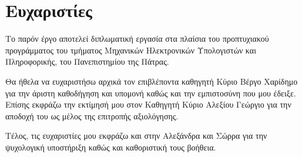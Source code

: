 \section*{Ευχαριστίες}
\thispagestyle{empty}
\begin{spacing}{1.5}
Το παρόν έργο αποτελεί διπλωματική εργασία στα πλαίσια του προπτυχιακού προγράμματος του τμήματος Μηχανικών Ηλεκτρονικών Υπολογιστών και Πληροφορικής, του Πανεπιστημίου της Πάτρας.

Θα ήθελα να ευχαριστήσω αρχικά τον επιβλέποντα καθηγητή Κύριο Βέργο Χαρίδημο για την άριστη καθοδήγηση και υπομονή καθώς και την εμπιστοσύνη που μου έδειξε. Επίσης εκφράζω την εκτίμησή μου στον Καθηγητή Κύριο Αλεξίου Γεώργιο για την αποδοχή του ως μέλος της επιτροπής αξιολόγησης.

Τέλος, τις ευχαριστίες μου εκφράζω και στην Αλεξάνδρα και Σώρρα για την ψυχολογική υποστήριξη καθώς και καθοριστική τους βοήθεια.
\end{spacing}